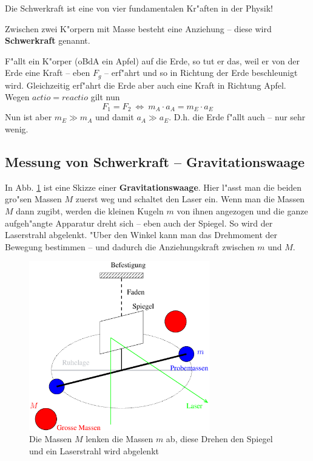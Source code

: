\begin{Def}[Schwerkraft]\label{def_schwerkraft}\label{def_gravitation}
     Die Schwerkraft ist eine von vier fundamentalen Kr"aften in der Physik! 
     
     Zwischen zwei K"orpern mit Masse besteht eine Anziehung -- diese
     wird \textbf{Schwerkraft} genannt.
\end{Def}

F"allt ein K"orper (oBdA ein Apfel) auf die Erde, so tut er das, weil
er von der Erde eine Kraft -- eben $F_g$ -- erf"ahrt und so in
Richtung der Erde beschleunigt wird. Gleichzeitig erf"ahrt die Erde
aber auch eine Kraft in Richtung Apfel. Wegen $actio = reactio$ gilt
nun
$$
F_1 = F_2 ~ \Leftrightarrow ~ m_A \cdot a_A = m_E \cdot a_E
$$
Nun ist aber $m_E \gg m_A$ und damit $a_A \gg a_E$. D.h. die Erde
f"allt auch -- nur sehr wenig.




\subsection{Messung von Schwerkraft -- Gravitationswaage}

In Abb. \ref{img_schwerkraftwaage} ist eine Skizze einer
\textbf{Gravitationswaage}. Hier l"asst man die beiden gro"sen Massen
$M$ zuerst weg und schaltet den Laser ein. Wenn man die Massen $M$
dann zugibt, werden die kleinen Kugeln $m$ von ihnen angezogen und die
ganze aufgeh"angte Apparatur dreht sich -- eben auch der Spiegel. So
wird der Laserstrahl abgelenkt. "Uber den Winkel kann man das
Drehmoment der Bewegung bestimmen -- und dadurch die Anziehungskraft
zwischen $m$ und $M$.

\begin{figure}
     \centering
     \includegraphics[width=0.7\textwidth]{bilder/gravitationswaage02}
     \caption[Gravitationswaage]{Die Massen $M$ lenken die Massen $m$
       ab, diese Drehen den Spiegel und ein Laserstrahl wird abgelenkt
}
     \label{img_schwerkraftwaage}
\end{figure}





